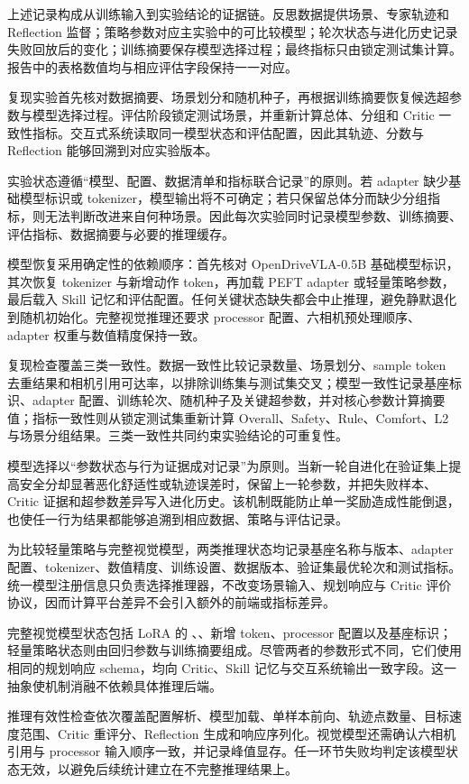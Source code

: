 \documentclass[UTF8,a4paper,12pt,fontset=fandol]{ctexart}
\begin{document}
上述记录构成从训练输入到实验结论的证据链。反思数据提供场景、专家轨迹和 Reflection 监督；策略参数对应主实验中的可比较模型；轮次状态与进化历史记录失败回放后的变化；训练摘要保存模型选择过程；最终指标只由锁定测试集计算。报告中的表格数值均与相应评估字段保持一一对应。

复现实验首先核对数据摘要、场景划分和随机种子，再根据训练摘要恢复候选超参数与模型选择过程。评估阶段锁定测试场景，并重新计算总体、分组和 Critic 一致性指标。交互式系统读取同一模型状态和评估配置，因此其轨迹、分数与 Reflection 能够回溯到对应实验版本。

实验状态遵循“模型、配置、数据清单和指标联合记录”的原则。若 adapter 缺少基础模型标识或 tokenizer，模型输出将不可确定；若只保留总体分而缺少分组指标，则无法判断改进来自何种场景。因此每次实验同时记录模型参数、训练摘要、评估指标、数据摘要与必要的推理缓存。

模型恢复采用确定性的依赖顺序：首先核对 OpenDriveVLA-0.5B 基础模型标识，其次恢复 tokenizer 与新增动作 token，再加载 PEFT adapter 或轻量策略参数，最后载入 Skill 记忆和评估配置。任何关键状态缺失都会中止推理，避免静默退化到随机初始化。完整视觉推理还要求 processor 配置、六相机预处理顺序、adapter 权重与数值精度保持一致。

复现检查覆盖三类一致性。数据一致性比较记录数量、场景划分、sample token 去重结果和相机引用可达率，以排除训练集与测试集交叉；模型一致性记录基座标识、adapter 配置、训练轮次、随机种子及关键超参数，并对核心参数计算摘要值；指标一致性则从锁定测试集重新计算 Overall、Safety、Rule、Comfort、L2 与场景分组结果。三类一致性共同约束实验结论的可重复性。

模型选择以“参数状态与行为证据成对记录”为原则。当新一轮自进化在验证集上提高安全分却显著恶化舒适性或轨迹误差时，保留上一轮参数，并把失败样本、Critic 证据和超参数差异写入进化历史。该机制既能防止单一奖励造成性能倒退，也使任一行为结果都能够追溯到相应数据、策略与评估记录。

为比较轻量策略与完整视觉模型，两类推理状态均记录基座名称与版本、adapter 配置、tokenizer、数值精度、训练设置、数据版本、验证集最优轮次和测试指标。统一模型注册信息只负责选择推理器，不改变场景输入、规划响应与 Critic 评价协议，因而计算平台差异不会引入额外的前端或指标差异。

完整视觉模型状态包括 LoRA 的 、、新增 token、processor 配置以及基座标识；轻量策略状态则由回归参数与训练摘要组成。尽管两者的参数形式不同，它们使用相同的规划响应 schema，均向 Critic、Skill 记忆与交互系统输出一致字段。这一抽象使机制消融不依赖具体推理后端。

推理有效性检查依次覆盖配置解析、模型加载、单样本前向、轨迹点数量、目标速度范围、Critic 重评分、Reflection 生成和响应序列化。视觉模型还需确认六相机引用与 processor 输入顺序一致，并记录峰值显存。任一环节失败均判定该模型状态无效，以避免后续统计建立在不完整推理结果上。
\end{document}
